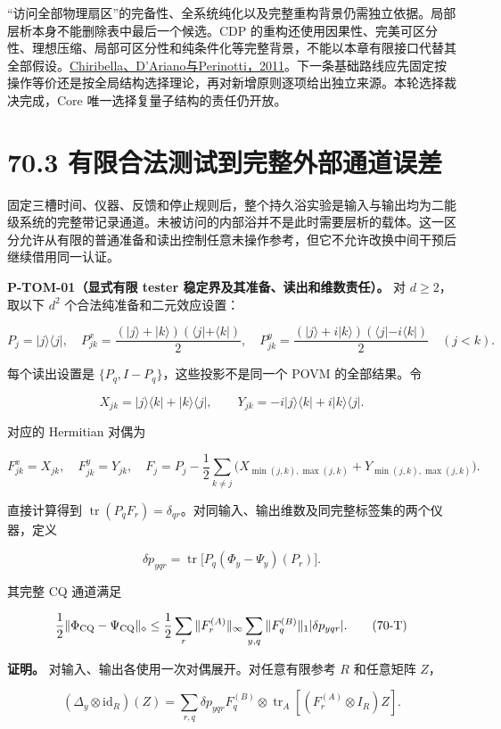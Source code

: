 \documentclass[
  11pt,
  oneside]{book}
\begin{document}
``访问全部物理扇区''的完备性、全系统纯化以及完整重构背景仍需独立依据。局部层析本身不能删除表中最后一个候选。CDP
的重构还使用因果性、完美可区分性、理想压缩、局部可区分性和纯条件化等完整背景，不能以本章有限接口代替其全部假设。\href{https://arxiv.org/abs/1011.6451}{Chiribella、D'Ariano与Perinotti，2011}。下一条基础路线应先固定按操作等价还是按全局结构选择理论，再对新增原则逐项给出独立来源。本轮选择裁决完成，Core
唯一选择复量子结构的责任仍开放。

\section{70.3 有限合法测试到完整外部通道误差}

固定三槽时间、仪器、反馈和停止规则后，整个持久浴实验是输入与输出均为二能级系统的完整带记录通道。未被访问的内部浴并不是此时需要层析的载体。这一区分允许从有限的普通准备和读出控制任意未操作参考，但它不允许改换中间干预后继续借用同一认证。

\protect\hypertarget{p-tom-01}{}{} \textbf{P-TOM-01（显式有限 tester
稳定界及其准备、读出和维数责任）。} 对 \(d\ge2\)，取以下 \(d^2\)
个合法纯准备和二元效应设置：

\[
P_j=|j\rangle\langle j|,\quad
P^x_{jk}=\frac{(|j\rangle+|k\rangle)(\langle j|+\langle k|)}2,\quad
P^y_{jk}=\frac{(|j\rangle+i|k\rangle)(\langle j|-i\langle k|)}2
\quad(j<k).
\]

每个读出设置是 \(\{P_q,I-P_q\}\)，这些投影不是同一个 POVM 的全部结果。令

\[
X_{jk}=|j\rangle\langle k|+|k\rangle\langle j|,\qquad
Y_{jk}=-i|j\rangle\langle k|+i|k\rangle\langle j|.
\]

对应的 Hermitian 对偶为

\[
F^x_{jk}=X_{jk},\quad F^y_{jk}=Y_{jk},\quad
F_j=P_j-\frac12\sum_{k\ne j}
\bigl(X_{\min(j,k),\max(j,k)}+Y_{\min(j,k),\max(j,k)}\bigr).
\]

直接计算得到
\(\operatorname{tr}(P_qF_r)=\delta_{qr}\)。对同输入、输出维数及同完整标签集的两个仪器，定义

\[
\delta p_{yqr}=\operatorname{tr}
\bigl[P_q(\Phi_y-\Psi_y)(P_r)\bigr].
\]

其完整 CQ 通道满足

\[
\frac12\|\Phi_{\rm CQ}-\Psi_{\rm CQ}\|_\diamond
\le\frac12\sum_r\|F_r^{(A)}\|_\infty
\sum_{y,q}\|F_q^{(B)}\|_1|\delta p_{yqr}|.
\tag{70-T}
\]

\textbf{证明。} 对输入、输出各使用一次对偶展开。对任意有限参考 \(R\)
和任意矩阵 \(Z\)，

\[
(\Delta_y\otimes\mathrm{id}_R)(Z)
=\sum_{r,q}\delta p_{yqr}F_q^{(B)}\otimes
\operatorname{tr}_A[(F_r^{(A)}\otimes I_R)Z].
\]
\end{document}

